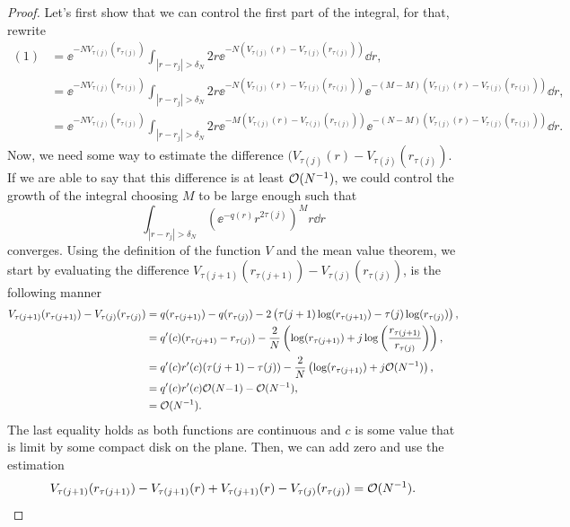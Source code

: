 \begin{proof}
Let's first show that we can control the first part of the integral, for that, rewrite
\begin{align}
	(1) & = \ee^{-N V_{\tau(j)}(r_{\tau(j)})} \int_{|r - r_j| > \delta_N} 2r \ee^{-N \left( V_{\tau(j)}(r) - V_{\tau(j)}(r_{\tau(j)}) \right)} \dd r, \\
	& = \ee^{-N V_{\tau(j)}(r_{\tau(j)})} \int_{|r - r_j| > \delta_N} 2r \ee^{-N \left( V_{\tau(j)}(r) - V_{\tau(j)}(r_{\tau(j)}) \right)}  \ee^{-(M-M) \left( V_{\tau(j)}(r) - V_{\tau(j)}(r_{\tau(j)}) \right)} \dd r, \\
	& = \ee^{-N V_{\tau(j)}(r_{\tau(j)})} \int_{|r - r_j| > \delta_N} 2r \ee^{-M \left( V_{\tau(j)}(r) - V_{\tau(j)}(r_{\tau(j)}) \right)}  \ee^{-(N-M) \left( V_{\tau(j)}(r) - V_{\tau(j)}(r_{\tau(j)}) \right)} \dd r.
\end{align}
Now, we need some way to estimate the difference $(V_{\tau(j)}(r) - V_{\tau(j)}(r_{\tau(j)})$. If we are able to say that this difference is at least $\mathcal{O}(N^{-1})$, we could control the growth of the integral choosing $M$ to be large enough such that
\begin{equation}
	\int_{|r - r_j| > \delta_N} \left( \ee^{-q(r)} r^{2 \tau(j)} \right)^M r \dd r
\end{equation}
converges. Using the definition of the function $V$ and the mean value theorem, we start by evaluating the difference $	V_{\tau(j+1)}(r_{\tau(j+1)}) - V_{\tau(j)}(r_{\tau(j)})$, is the following manner
\begin{align}
	V_{\tau(j+1)}(r_{\tau(j+1)}) - V_{\tau(j)}(r_{\tau(j)}) &= q(r_{\tau(j+1)}) - q(r_{\tau(j)}) - 2 \left( \tau(j+1) \log(r_{\tau(j+1)}) - \tau(j) \log(r_{\tau(j)}) \right), \\
	& = q'(c) (r_{\tau(j+1)} - r_{\tau(j)}) - \frac{2}{N} \left(\log(r_{\tau(j+1)})+j\log\left(\frac{r_{\tau(j+1)}}{r_{\tau(j)}} \right) \right), \\
	& = q'(c) r'(c) (\tau(j+1) - \tau(j)) - \frac{2}{N} \left(\log(r_{\tau(j+1)})+j \mathcal{O}(N^{-1}) \right), \\
	& = q'(c) r'(c) \mathcal{O}(N{-1}) - \mathcal{O}(N^{-1}), \\
	& = \mathcal{O}(N^{-1}).
\end{align}
The last equality holds as both functions are continuous and $c$ is some value that is limit by some compact disk on the plane. Then, we can add zero and use the estimation
\begin{equation}
	V_{\tau(j+1)}(r_{\tau(j+1)})  - V_{\tau(j+1)}(r) + V_{\tau(j+1)}(r) - V_{\tau(j)}(r_{\tau(j)}) = \Boh(N^{-1}).

\end{equation}
\end{proof}
